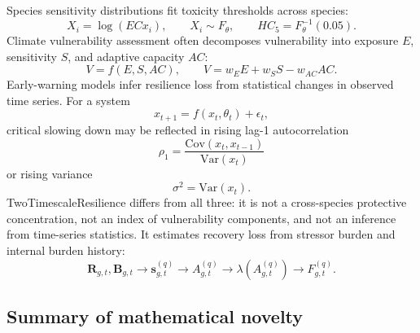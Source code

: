 Species sensitivity distributions fit toxicity thresholds across species:
\begin{equation}
  X_i=\log(ECx_i),\qquad X_i\sim F_\theta,
  \qquad
  HC_5=F_\theta^{-1}(0.05).
\end{equation}
Climate vulnerability assessment often decomposes vulnerability into exposure $E$, sensitivity $S$, and adaptive capacity $AC$:
\begin{equation}
  V=f(E,S,AC),
  \qquad
  V=w_EE+w_SS-w_{AC}AC.
\end{equation}
Early-warning models infer resilience loss from statistical changes in observed time series. For a system
\begin{equation}
  x_{t+1}=f(x_t,\theta_t)+\epsilon_t,
\end{equation}
critical slowing down may be reflected in rising lag-1 autocorrelation
\begin{equation}
  \rho_1=\frac{\mathrm{Cov}(x_t,x_{t-1})}{\mathrm{Var}(x_t)}
\end{equation}
or rising variance
\begin{equation}
  \sigma^2=\mathrm{Var}(x_t).
\end{equation}
TwoTimescaleResilience differs from all three: it is not a cross-species protective concentration, not an index of vulnerability components, and not an inference from time-series statistics. It estimates recovery loss from stressor burden and internal burden history:
\begin{equation}
  \mathbf{R}_{g,t},\mathbf{B}_{g,t}\rightarrow\mathbf{s}_{g,t}^{(q)}\rightarrow A_{g,t}^{(q)}\rightarrow\lambda(A_{g,t}^{(q)})\rightarrow F_{g,t}^{(q)}.
\end{equation}

\subsection{Summary of mathematical novelty}

